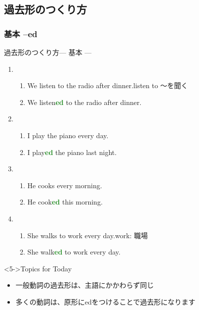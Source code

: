 \documentclass[aspectratio=169,xcolor={dvipsnames,table}]{beamer}
\newcommand{\myaudio}[1]{\href{#1}{\faVolumeUp}}
\begin{document}
\subsection{過去形のつくり方}
\subsubsection{基本 --ed}
\begin{frame}[plain]{過去形のつくり方--- 基本 ---}
 
\begin{enumerate}
 \item<1-> \begin{enumerate}
	\item We listen to the radio after dinner.\hfill{\scriptsize listen to ～を聞く\,}
	\item We listen\textcolor{ForestGreen}{\bfseries ed} to the radio after dinner.
       \end{enumerate}
 \item<2-> \begin{enumerate}
	\item I play the piano every day.
	\item I play\textcolor{ForestGreen}{\bfseries ed} the piano last night.
       \end{enumerate}
 \item<3-> \begin{enumerate}
	\item He cooks every morning.
	\item He cook\textcolor{ForestGreen}{\bfseries ed} this morning.
       \end{enumerate}

 \item<4-> \begin{enumerate}
	\item She walks to work every day.\hfill{}{\scriptsize work: 職場}
	\item She walk\textcolor{ForestGreen}{\bfseries ed} to work every day.
       \end{enumerate}
\end{enumerate}

\begin{block}<5->{Topics for Today}\small
\begin{itemize}[square]
 \item 一般動詞の過去形は、主語にかかわらず同じ
 \item 多くの動詞は、原形にedをつけることで過去形になります
\end{itemize}
\end{block}
\hfill\myaudio{./audio/025_past_do_02.mp3}

\end{frame}
\end{document}
